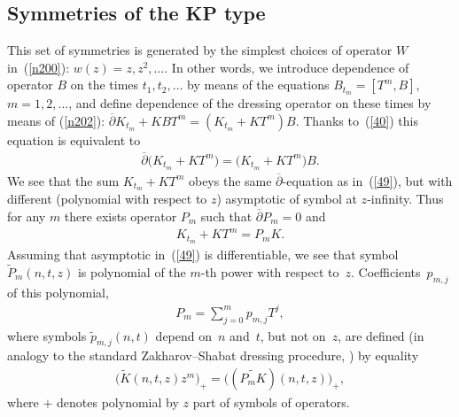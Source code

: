 \documentclass[pdftex]{sigma}
\numberwithin{equation}{section}
\begin{document}
\subsection{Symmetries of the KP type}
This set of symmetries is generated by the simplest choices of operator $W$ in~(\ref{n200}): $w(z)=z,z^{2},\ldots$. In other words, we introduce dependence of operator $B$ on the times $t_1,t_2,\ldots$ by means of the equations $B_{t_m}=[T^{m},B]$, $m=1,2,\ldots$, and def\/ine dependence of the dressing operator on these times by means of (\ref{n202}): $\overline\partial{K}_{t_m}+KBT^{m}=(K_{t_m}+KT^{m})B$. Thanks to~(\ref{40}) this equation is equivalent to
\begin{gather}
 \overline\partial\big({K}_{t_m}+KT^{m}\big)=\big({K}_{t_m}+KT^{m}\big)B.\label{n21}
\end{gather}
We see that the sum ${K}_{t_m}+KT^{m}$ obeys the same $\overline\partial$-equation as in~(\ref{49}), but with dif\/ferent (polynomial with respect to $z$) asymptotic of symbol at $z$-inf\/inity. Thus for any $m$ there exists operator $P_{m}$ such that $\overline{\partial}P_{m}=0$ and
\begin{gather}
 {K}_{t_m}+KT^{m}=P_{m}K.\label{n22}
\end{gather}
Assuming that asymptotic in~(\ref{49}) is dif\/ferentiable, we see that symbol $\widetilde{P}_{m}(n,t,z)$ is polynomial of the $m$-th power with respect to~$z$. Coef\/f\/icients~$p_{m,j}$ of this polynomial,
\begin{gather}
P_{m}=\sum_{j=0}^{m}p_{m,j}T^{j},\label{n:22}
\end{gather}
where symbols $\widetilde{p}_{m,j}(n,t)$ depend on~$n$ and~$t$, but not on~$z$, are def\/ined (in analogy to the standard Zakharov--Shabat dressing procedure, \cite{Zakharov/Shabat}) by equality
\begin{gather}
\big(\widetilde{K}(n,t,z)z^{m}\big)_{+}=\big((\widetilde{P_{m}K})(n,t,z)\big)_{+},\label{n23}
\end{gather}
where $+$ denotes polynomial by $z$ part of symbols of operators.
\end{document}
